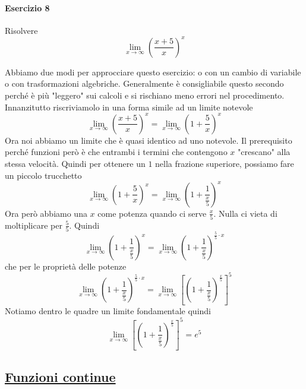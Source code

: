 \paragraph{Esercizio 8}
Risolvere
\begin{equation*}
  \lim\limits_{x\to\infty}\left(\frac{x+5}{x}\right)^x
\end{equation*}
\divisor

Abbiamo due modi per approcciare questo esercizio: o con un cambio di variabile o con trasformazioni
algebriche. Generalmente è consigliabile questo secondo perché è più "leggero" sui calcoli e si 
rischiano meno errori nel procedimento.\\
Innanzitutto riscriviamolo in una forma simile ad un limite notevole
\begin{equation*}
  \lim\limits_{x\to\infty}\left(\frac{x+5}{x}\right)^x = 
  \lim\limits_{x\to\infty}\left(1+\frac{5}{x}\right)^x
\end{equation*}
Ora noi abbiamo un limite che è quasi identico ad uno notevole. Il prerequisito perché funzioni però
è che entrambi i termini che contengono $x$ "crescano" alla stessa velocità. Quindi per ottenere
un $1$ nella frazione superiore, possiamo fare un piccolo trucchetto
\begin{equation*}
  \lim\limits_{x\to\infty}\left(1+\frac{5}{x}\right)^x=
  \lim\limits_{x\to\infty}\left(1+\frac{1}{\frac{x}{5}}\right)^x
\end{equation*}
Ora però abbiamo una $x$ come potenza quando ci serve $\frac{x}{5}$. Nulla ci vieta di moltiplicare
per $\frac{5}{5}$. Quindi
\begin{equation*}
  \lim\limits_{x\to\infty}\left(1+\frac{1}{\frac{x}{5}}\right)^x=
  \lim\limits_{x\to\infty}\left(1+\frac{1}{\frac{x}{5}}\right)^{\frac{5}{5}\cdot x}
\end{equation*}
che per le proprietà delle potenze
\begin{equation*}
  \lim\limits_{x\to\infty}\left(1+\frac{1}{\frac{x}{5}}\right)^{\frac{5}{5}\cdot x}=
  \lim\limits_{x\to\infty}\left[\left(1+\frac{1}{\frac{x}{5}}\right)^\frac{x}{5}\right]^5
\end{equation*}
Notiamo dentro le quadre un limite fondamentale quindi
\begin{equation*}
  \lim\limits_{x\to\infty}\left[\left(1+\frac{1}{\frac{x}{5}}\right)^\frac{x}{5}\right]^5=\boxed{e^5}
\end{equation*}

\subsection*{\hyperref[sec:funzCont]{Funzioni continue}}
\label{ex:funzCont}

